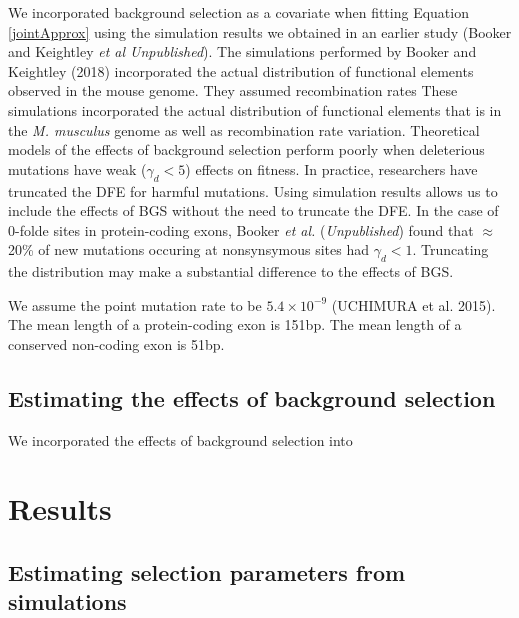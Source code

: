 \documentclass[11pt]{article}
\begin{document}
	
 	We incorporated background selection as a covariate when fitting Equation \ref{jointApprox} using the simulation results we obtained in an earlier study (Booker and Keightley \textit{et al Unpublished}). The simulations performed by Booker and Keightley (2018) incorporated the actual distribution of functional elements observed in the mouse genome. They assumed recombination rates 
 	These simulations incorporated the actual distribution of functional elements that is in the \textit{M. musculus} genome as well as recombination rate variation. Theoretical models of the effects of background selection perform poorly when deleterious mutations have weak ($\gamma_d < 5$) 	effects on fitness. In practice, researchers have truncated the DFE for harmful mutations. Using simulation results allows us to include the effects of BGS without the need to truncate the DFE. In the case of 0-folde sites in protein-coding exons, Booker \textit{et al.} (\textit{Unpublished}) found that $\approx$ 20\% of new mutations occuring at nonsynsymous sites had $\gamma_d < 1$. Truncating the distribution may make a substantial difference to the effects of BGS. 
 	
	We assume the point mutation rate to be $5.4 \times 10^{-9}$ (UCHIMURA et al. 2015).
 	The mean length of a protein-coding exon is 151bp.
 	The mean length of a conserved non-coding exon is 51bp.
 	
\subsection*{Estimating the effects of background selection}

We incorporated the effects of background selection into 


%
%

\section*{Results}
\subsection*{Estimating selection parameters from simulations}
\end{document}
